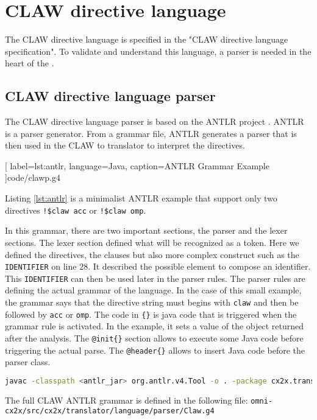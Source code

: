 \chapter{CLAW directive language}
The CLAW directive language is specified in the "CLAW directive language
specification". To validate and understand this language, a parser is needed
in the heart of the \clawfcomp.

\section{CLAW directive language parser}
The CLAW directive language parser is based on the ANTLR project
\cite{Parr:2013:DAR:2501720}. ANTLR is a parser generator. From a grammar file,
ANTLR generates a parser that is then used in the CLAW \xcodeml to \xcodeml
translator to interpret the directives.


  [
    label=lst:antlr,
    language=Java,
    caption=ANTLR Grammar Example
  ]{code/clawp.g4}

Listing \ref{lst:antlr} is a minimalist ANTLR example that support only two
directives \lstinline|!$claw acc| or \lstinline|!$claw omp|.

In this grammar, there are two important sections, the parser and the lexer
sections. The lexer section defined what will be recognized as a token. Here
we defined the directives, the clauses but also more complex construct such as
the \lstinline|IDENTIFIER| on line 28. It described the possible element to
compose an identifier. This \lstinline|IDENTIFIER| can then be used later in
the parser rules.
The parser rules are defining the actual grammar of the language. In the case
of this small example, the grammar says that the directive string must begins
with \lstinline|claw| and then be followed by \lstinline|acc| or
\lstinline|omp|. The code in \lstinline|{}| is java code that is triggered
when the grammar rule is activated. In the example, it sets a value of the
object returned after the analysis.
The \lstinline|@init{}| section allows to execute some Java code before
triggering the actual parse. The \lstinline|@header{}| allows to insert Java
code before the parser class.

\begin{lstlisting}[label=lst:antlr_cmd, caption=ANTLR parser generation command, language=bash]
javac -classpath <antlr_jar> org.antlr.v4.Tool -o . -package cx2x.translator.language.parser Claw.g4
\end{lstlisting}

The full CLAW ANTLR grammar is defined in the following file:
\lstinline|omni-cx2x/src/cx2x/translator/language/parser/Claw.g4|
